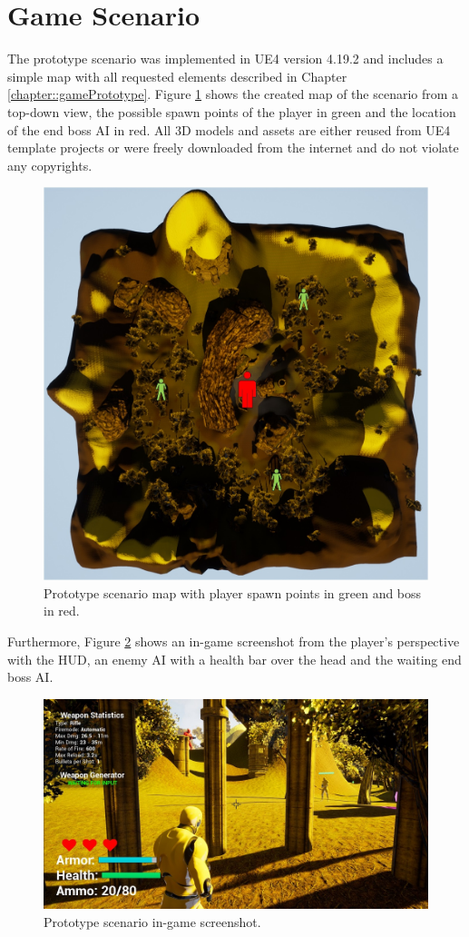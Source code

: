 \documentclass[MGS,Master,english]{twbook}%
\begin{document}
\section{Game Scenario}
The prototype scenario was implemented in UE4 version 4.19.2 and includes a simple map with all requested elements described in Chapter \ref{chapter::gamePrototype}. Figure \ref{scenarioMap} shows the created map of the scenario from a top-down view, the possible spawn points of the player in green and the location of the end boss AI in red. All 3D models and assets are either reused from UE4 template projects or were freely downloaded from the internet and do not violate any copyrights.
\begin{figure}[!ht]
	\centering
	\includegraphics[width=0.6\linewidth]{PICs/Prototype/map_with_spawnpoints_and_boss}
	\caption{Prototype scenario map with player spawn points in green and boss in red.} \label{scenarioMap}
\end{figure}

Furthermore, Figure \ref{scenarioScreenshot} shows an in-game screenshot from the player's perspective with the HUD, an enemy AI with a health bar over the head and the waiting end boss AI.
\begin{figure}[!ht]
	\centering
	\includegraphics[width=1.0\linewidth]{PICs/Prototype/ingame_screenshot_small}
	\caption{Prototype scenario in-game screenshot.} \label{scenarioScreenshot}
\end{figure}
\end{document}
